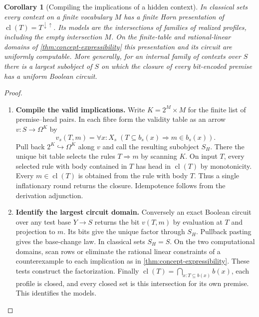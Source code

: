 \documentclass[11pt,a4paper]{article}
\newtheorem{corollary}[corollary]{Corollary}
\theoremstyle{definition}
\theoremstyle{remark}\newaliascnt{remark}{theorem}
\numberwithin{equation}{section}
\begin{document}
\begin{corollary}[Compiling the implications of a hidden context]\label{cor:concept-horn}
In classical sets every context on a finite vocabulary $M$ has a finite Horn presentation of $\operatorname{cl}(T)=T^{\downarrow\uparrow}$. Its models are the intersections of families of realized profiles, including the empty intersection $M$. On the finite-table and rational-linear domains of \cref{thm:concept-expressibility} this presentation and its circuit are uniformly computable. More generally, for an internal family of contexts over $S$ there is a largest subobject of $S$ on which the closure of every bit-encoded premise has a uniform Boolean circuit.
\end{corollary}
\begin{proof}\leavevmode
\begin{enumerate}[titledsteps]
    \item \textbf{Compile the valid implications.} Write $K=2^M\times M$ for the finite list of premise--head pairs. In each fibre form the validity table as an arrow $v:S\to\Omega^K$ by
\[
 v_s(T,m)=\forall x:X_s\;(T\subseteq b_s(x)\Rightarrow m\in b_s(x)).
\]
Pull back $2^K\hookrightarrow\Omega^K$ along $v$ and call the resulting subobject $S_H$. There the unique bit table selects the rules $T\Rightarrow m$ by scanning $K$. On input $T$, every selected rule with body contained in $T$ has head in $\operatorname{cl}(T)$ by monotonicity. Every $m\in\operatorname{cl}(T)$ is obtained from the rule with body $T$. Thus a single inflationary round returns the closure. Idempotence follows from the derivation adjunction. 
    \item \textbf{Identify the largest circuit domain.} Conversely an exact Boolean circuit over any test base $Y\to S$ returns the bit $v(T,m)$ by evaluation at $T$ and projection to $m$. Its bits give the unique factor through $S_H$. Pullback pasting gives the base-change law. In classical sets $S_H=S$. On the two computational domains, scan rows or eliminate the rational linear constraints of a counterexample to each implication as in \cref{thm:concept-expressibility}. These tests construct the factorization. Finally $\operatorname{cl}(T)=\bigcap_{x:T\subseteq b(x)} b(x)$, each profile is closed, and every closed set is this intersection for its own premise. This identifies the models.



\end{enumerate}
\end{proof}
\end{document}
